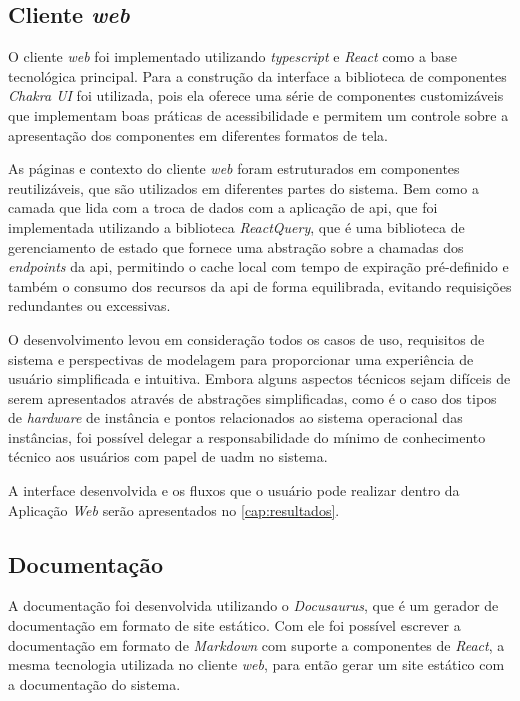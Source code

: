 \subsection{Cliente \textit{web}}
\label{subsec:clienteWeb}

O cliente \textit{web} foi implementado utilizando \textit{typescript} e \textit{React} como a base tecnológica principal. Para a construção da interface a biblioteca de componentes \textit{Chakra UI} foi utilizada, pois ela oferece uma série de componentes customizáveis que implementam boas práticas de acessibilidade e permitem um controle sobre a apresentação dos componentes em diferentes formatos de tela.

As páginas e contexto do cliente \textit{web} foram estruturados em componentes reutilizáveis, que são utilizados em diferentes partes do sistema. Bem como a camada que lida com a troca de dados com a aplicação de \gls{api}, que foi implementada utilizando a biblioteca \textit{ReactQuery}, que é uma biblioteca de gerenciamento de estado que fornece uma abstração sobre a chamadas dos \textit{endpoints} da \gls{api}, permitindo o cache local com tempo de expiração pré-definido e também o consumo dos recursos da \gls{api} de forma equilibrada, evitando requisições redundantes ou excessivas.

O desenvolvimento levou em consideração todos os casos de uso, requisitos de sistema e perspectivas de modelagem para proporcionar uma experiência de usuário simplificada e intuitiva. Embora alguns aspectos técnicos sejam difíceis de serem apresentados através de abstrações simplificadas, como é o caso dos tipos de \textit{hardware} de instância e pontos relacionados ao sistema operacional das instâncias, foi possível delegar a responsabilidade do mínimo de conhecimento técnico aos usuários com papel de \gls{uadm} no sistema.

A interface desenvolvida e os fluxos que o usuário pode realizar dentro da Aplicação \textit{Web} serão apresentados no \autoref{cap:resultados}.

\subsection{Documentação}
\label{subsec:documentacao}

A documentação foi desenvolvida utilizando o \textit{Docusaurus}, que é um gerador de documentação em formato de site estático. Com ele foi possível escrever a documentação em formato de \textit{Markdown} com suporte a componentes de \textit{React}, a mesma tecnologia utilizada no cliente \textit{web}, para então gerar um site estático com a documentação do sistema.


